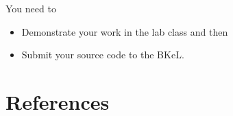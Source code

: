 \documentclass[twoside, final]{hcmut_report}
\begin{document}
You need to 
\begin{itemize}
    \item Demonstrate your work in the lab class and then
    \item Submit your source code to the BKeL.    
\end{itemize}

\section*{References}
\end{document}
